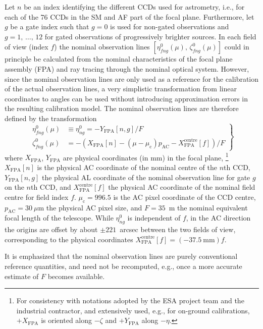 \documentclass[structabstract]{aa}
\begin{document}
Let $n$ be an index identifying the different CCDs used for astrometry,
i.e., for each of the 76 CCDs in the SM and AF part of the focal plane.
Furthermore, let $g$ be a gate index such that $g=0$ is used for non-gated
observations and $g=1,\,\dots,\,12$ for gated observations of progressively
brighter sources. In each field of view (index $f$) the nominal observation
lines $\left[\eta^0_{fng}(\mu),\,\zeta^0_{fng}(\mu)\right]$
could in principle be calculated from the nominal characteristics of the
focal plane assembly (FPA) and ray tracing through the nominal optical
system. However, since the nominal observation lines are only used as
a reference for the calibration of the actual observation lines, a very
simplistic transformation from linear coordinates to angles can be used
without introducing approximation errors in the resulting calibration model.
The nominal observation lines are therefore defined by the transformation
\begin{equation}\label{eq:etazeta0}
\left.
\begin{aligned}
\eta^0_{fng}(\mu) &\equiv \eta^0_{ng} = -Y_\text{FPA}[n,g]/F  \\
\zeta^0_{fng}(\mu) &= -\left(X_\text{FPA}[n]-(\mu-\mu_\text{c})p_\text{AC}
-X_\text{FPA}^\text{centre}[f]\right)/F
\end{aligned}
\right\}
\end{equation}
where $X_\text{FPA}$, $Y_\text{FPA}$ are physical coordinates (in mm) in
the focal plane,%
\footnote{For consistency with notations adopted by the ESA project team
and the industrial contractor, and extensively used, e.g., for on-ground
calibrations, $+X_\text{FPA}$ is oriented along $-\zeta$ and $+Y_\text{FPA}$
along $-\eta$.}
$X_\text{FPA}[n]$ is the physical AC coordinate of the nominal centre of
the $n$th CCD, $Y_\text{FPA}[n,g]$ the physical AL coordinate of the
nominal observation line for gate $g$ on the $n$th CCD, and
$X_\text{FPA}^\text{centre}[f]$ the physical AC coordinate of the
nominal field centre for field index $f$. $\mu_\text{c}=996.5$ is the AC pixel
coordinate of the CCD centre, $p_\text{AC}=30~\mu$m the physical AC pixel
size, and $F=35$~m the nominal equivalent focal length of the telescope.
While $\eta^0_{ng}$ is independent of $f$, in the AC direction the origins
are offset by about $\pm 221$~arcsec between the two fields of view,
corresponding to the physical coordinates
$X_\text{FPA}^\text{centre}[f]=(-37.5~\text{mm})f.$

It is emphasized that the nominal observation lines are purely conventional
reference quantities, and need not be recomputed, e.g., once a more accurate
estimate of $F$ becomes available.
\end{document}
